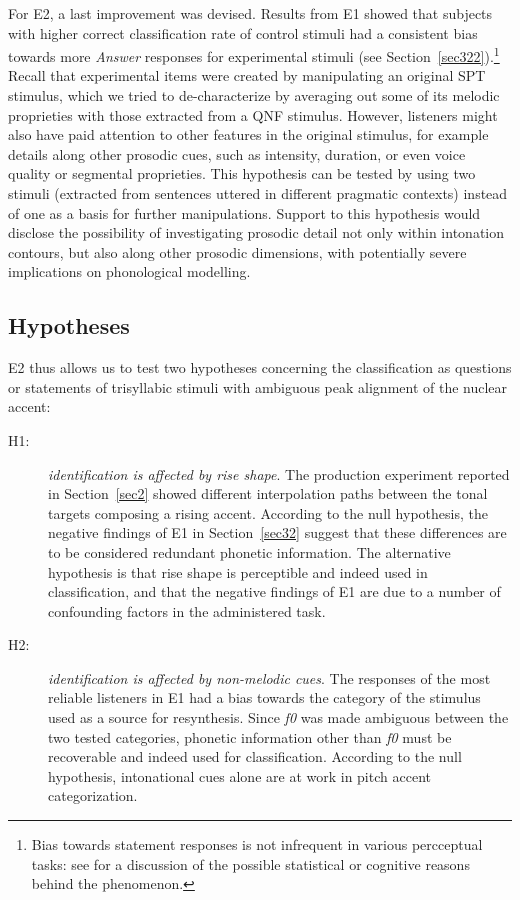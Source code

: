 For E2, a last improvement was devised. Results from E1 showed that subjects with higher correct classification rate of control stimuli had a consistent bias towards more \textit{Answer} responses for experimental stimuli (see Section~\ref{sec322}).\footnote{Bias towards statement responses is not infrequent in various percceptual tasks: see \citet{petrone2014intonation} for a discussion of the possible statistical or cognitive \citep{pandelaere2006question} reasons behind the phenomenon.} Recall that experimental items were created by manipulating an original SPT stimulus, which we tried to de-characterize by averaging out some of its melodic proprieties with those extracted from a QNF stimulus. However, listeners might also have paid attention to other features in the original stimulus, for example details along other prosodic cues, such as intensity, duration, or even voice quality or segmental proprieties. This hypothesis can be tested by using two stimuli (extracted from sentences uttered in different pragmatic contexts) instead of one as a basis for further manipulations. Support to this hypothesis would disclose the possibility of investigating prosodic detail not only within intonation contours, but also along other prosodic dimensions, with potentially severe implications on phonological modelling.

\subsection{Hypotheses}\label{sec330}
E2 thus allows us to test two hypotheses concerning the classification as questions or statements of trisyllabic stimuli with ambiguous peak alignment of the nuclear accent:

\begin{description}
   \item[H1:] \textit{identification is affected by rise shape}. The production experiment reported in Section~\ref{sec2} showed different interpolation paths between the tonal targets composing a rising accent. According to the null hypothesis, the negative findings of E1 in Section~\ref{sec32} suggest that these differences are to be considered redundant phonetic information. The alternative hypothesis is that rise shape is perceptible and indeed used in classification, and that the negative findings of E1 are due to a number of confounding factors in the administered task.
   \item[H2:] \textit{identification is affected by non-melodic cues}. The responses of the most reliable listeners in E1 had a bias towards the category of the stimulus used as a source for resynthesis. Since \textit{f0} was made ambiguous between the two tested categories, phonetic information other than \textit{f0} must be recoverable and indeed used for classification. According to the null hypothesis, intonational cues alone are at work in pitch accent categorization.
\end{description}

